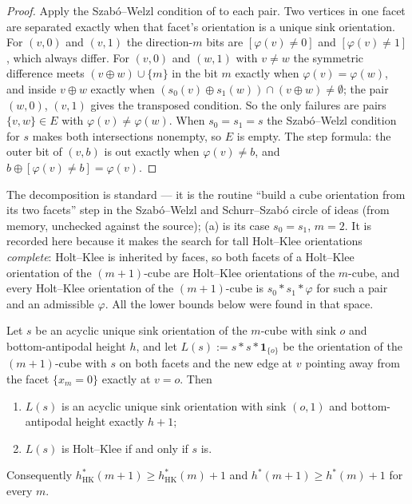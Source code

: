 \begin{proof}
Apply the Szab\'o--Welzl condition of  to each
pair. Two vertices in one facet are separated exactly when that facet's
orientation is a unique sink orientation. For $(v,0)$ and $(v,1)$ the
direction-$m$ bits are $[\varphi(v)\ne0]$ and $[\varphi(v)\ne1]$, which
always differ. For $(v,0)$ and $(w,1)$ with $v\ne w$ the symmetric
difference meets $(v\oplus w)\cup\{m\}$ in the bit $m$ exactly when
$\varphi(v)=\varphi(w)$, and inside $v\oplus w$ exactly when
$(s_0(v)\oplus s_1(w))\cap(v\oplus w)\ne\emptyset$; the pair $(w,0)$,
$(v,1)$ gives the transposed condition. So the only failures are pairs
$\{v,w\}\in E$ with $\varphi(v)\ne\varphi(w)$. When $s_0=s_1=s$ the
Szab\'o--Welzl condition for $s$ makes both intersections nonempty, so $E$
is empty. The step formula: the outer bit of $(v,b)$ is out exactly when
$\varphi(v)\ne b$, and $b\oplus[\varphi(v)\ne b]=\varphi(v)$.
\end{proof}

\begin{remark}\label{hkd:rem-facet}
The decomposition is standard --- it is the routine ``build a cube
orientation from its two facets'' step in the Szab\'o--Welzl and
Schurr--Szab\'o circle of ideas (from memory, unchecked against the
source); (a) is its case $s_0=s_1$, $m=2$. It is recorded
here because it makes the search for tall Holt--Klee orientations
\emph{complete}: Holt--Klee is inherited by faces, so both facets of a
Holt--Klee orientation of the $(m+1)$-cube are Holt--Klee orientations of
the $m$-cube, and every Holt--Klee orientation of the $(m+1)$-cube is
$s_0\!*\!s_1\!*\!\varphi$ for such a pair and an admissible $\varphi$. All
the lower bounds below were found in that space.
\end{remark}

\begin{theorem}\label{hkd:plus-one}
Let $s$ be an acyclic unique sink orientation of the $m$-cube with sink $o$
and bottom-antipodal height $h$, and let
$L(s):=s\!*\!s\!*\!\mathbf 1_{\{o\}}$ be the orientation of the
$(m+1)$-cube with $s$ on both facets and the new edge at $v$ pointing away
from the facet $\{x_m=0\}$ exactly at $v=o$. Then
\begin{enumerate}
\item[(i)] $L(s)$ is an acyclic unique sink orientation with sink $(o,1)$
and bottom-antipodal height exactly $h+1$;
\item[(ii)] $L(s)$ is Holt--Klee if and only if $s$ is.
\end{enumerate}
Consequently $h^{\ast}_{\mathrm{HK}}(m+1)\ge h^{\ast}_{\mathrm{HK}}(m)+1$
and $h^{\ast}(m+1)\ge h^{\ast}(m)+1$ for every $m$.
\end{theorem}

